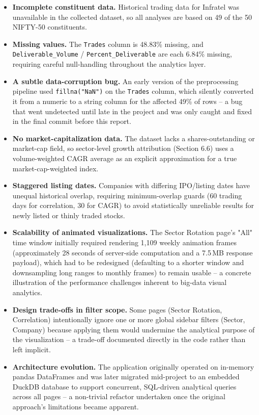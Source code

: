 \documentclass[14pt,a4paper]{extreport}
\begin{document}
\begin{itemize}
    \item \textbf{Incomplete constituent data.} Historical trading data for
        Infratel was unavailable in the collected dataset, so all analyses
        are based on 49 of the 50 NIFTY-50 constituents.
    \item \textbf{Missing values.} The \texttt{Trades} column is 48.83\%
        missing, and \texttt{Deliverable\_Volume} / \texttt{Percent\_Deliverable}
        are each 6.84\% missing, requiring careful null-handling throughout
        the analytics layer.
    \item \textbf{A subtle data-corruption bug.} An early version of the
        preprocessing pipeline used \texttt{fillna("NaN")} on the
        \texttt{Trades} column, which silently converted it from a numeric
        to a string column for the affected 49\% of rows -- a bug that
        went undetected until late in the project and was only caught and
        fixed in the final commit before this report.
    \item \textbf{No market-capitalization data.} The dataset lacks a
        shares-outstanding or market-cap field, so sector-level growth
        attribution (Section 6.6) uses a volume-weighted CAGR average as an
        explicit approximation for a true market-cap-weighted index.
    \item \textbf{Staggered listing dates.} Companies with differing
        IPO/listing dates have unequal historical overlap, requiring
        minimum-overlap guards (60 trading days for correlation, 30 for
        CAGR) to avoid statistically unreliable results for newly listed
        or thinly traded stocks.
    \item \textbf{Scalability of animated visualizations.} The Sector
        Rotation page's "All" time window initially required rendering
        1{,}109 weekly animation frames (approximately 28 seconds of
        server-side computation and a 7.5\,MB response payload), which had
        to be redesigned (defaulting to a shorter window and downsampling
        long ranges to monthly frames) to remain usable -- a concrete
        illustration of the performance challenges inherent to
        big-data visual analytics.
    \item \textbf{Design trade-offs in filter scope.} Some pages (Sector
        Rotation, Correlation) intentionally ignore one or more global
        sidebar filters (Sector, Company) because applying them would
        undermine the analytical purpose of the visualization -- a
        trade-off documented directly in the code rather than left
        implicit.
    \item \textbf{Architecture evolution.} The application originally
        operated on in-memory pandas DataFrames and was later migrated
        mid-project to an embedded DuckDB database to support concurrent,
        SQL-driven analytical queries across all pages -- a non-trivial
        refactor undertaken once the original approach's limitations
        became apparent.
\end{itemize}
\end{document}
